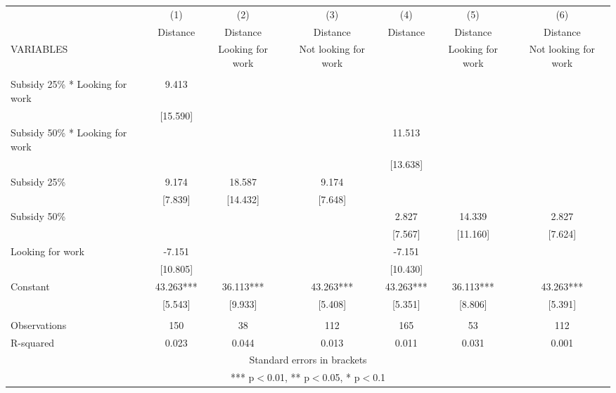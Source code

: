 \begin{tabular}{lcccccc} \hline
 & (1) & (2) & (3) & (4) & (5) & (6) \\
 & Distance & Distance & Distance & Distance & Distance & Distance \\
VARIABLES &  & Looking for work & Not looking for work &  & Looking for work & Not looking for work \\ \hline
 &  &  &  &  &  &  \\
Subsidy 25\% * Looking for work & 9.413 &  &  &  &  &  \\
 & [15.590] &  &  &  &  &  \\
Subsidy 50\% * Looking for work &  &  &  & 11.513 &  &  \\
 &  &  &  & [13.638] &  &  \\
Subsidy 25\% & 9.174 & 18.587 & 9.174 &  &  &  \\
 & [7.839] & [14.432] & [7.648] &  &  &  \\
Subsidy 50\% &  &  &  & 2.827 & 14.339 & 2.827 \\
 &  &  &  & [7.567] & [11.160] & [7.624] \\
Looking for work & -7.151 &  &  & -7.151 &  &  \\
 & [10.805] &  &  & [10.430] &  &  \\
Constant & 43.263*** & 36.113*** & 43.263*** & 43.263*** & 36.113*** & 43.263*** \\
 & [5.543] & [9.933] & [5.408] & [5.351] & [8.806] & [5.391] \\
 &  &  &  &  &  &  \\
Observations & 150 & 38 & 112 & 165 & 53 & 112 \\
 R-squared & 0.023 & 0.044 & 0.013 & 0.011 & 0.031 & 0.001 \\ \hline
\multicolumn{7}{c}{ Standard errors in brackets} \\
\multicolumn{7}{c}{ *** p$<$0.01, ** p$<$0.05, * p$<$0.1} \\
\end{tabular}
